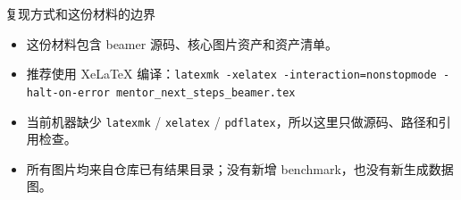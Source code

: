 \documentclass[UTF8,aspectratio=169,10pt]{ctexbeamer}
\begin{document}
\begin{frame}{复现方式和这份材料的边界}
\begin{itemize}
  \item 这份材料包含 beamer 源码、核心图片资产和资产清单。
  \item 推荐使用 XeLaTeX 编译：\texttt{latexmk -xelatex -interaction=nonstopmode -halt-on-error mentor\_next\_steps\_beamer.tex}
  \item 当前机器缺少 \texttt{latexmk} / \texttt{xelatex} / \texttt{pdflatex}，所以这里只做源码、路径和引用检查。
  \item 所有图片均来自仓库已有结果目录；没有新增 benchmark，也没有新生成数据图。
\end{itemize}
\end{frame}
\end{document}

